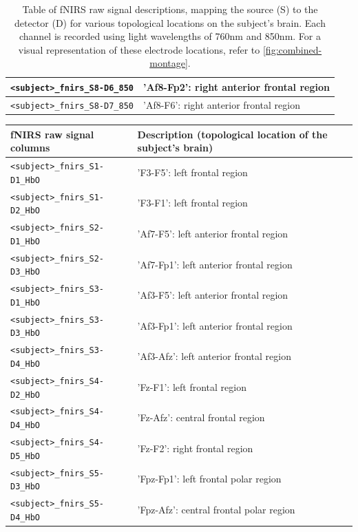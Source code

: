 \begin{table}
\begin{tabularx}{\textwidth}{|l|X|}
  \hline
  \texttt{<subject>\_fnirs\_S8-D6\_850} & 'Af8-Fp2': right anterior frontal region  \\
  \hline
  \texttt{<subject>\_fnirs\_S8-D7\_850} & 'Af8-F6': right anterior frontal region  \\
  \hline
  \end{tabularx}
  \caption{Table of fNIRS raw signal descriptions, mapping the source (S) to the detector (D) for various topological locations on the subject's brain. Each channel is recorded using light wavelengths of 760nm and 850nm. For a visual representation of these electrode locations, refer to \autoref{fig:combined-montage}.}
  \label{tab:fNIRS_raw_signals}
  \end{table}

  \begin{table}
    \centering
    \begin{tabularx}{\textwidth}{|l|X|}
    \hline
    \textbf{fNIRS raw signal columns} & \textbf{Description (topological location of the subject's brain)} \\
    \hline
    \texttt{<subject>\_fnirs\_S1-D1\_HbO} & 'F3-F5': left frontal region \\
    \hline
    \texttt{<subject>\_fnirs\_S1-D2\_HbO} & 'F3-F1': left frontal region  \\
    \hline
    \texttt{<subject>\_fnirs\_S2-D1\_HbO} & 'Af7-F5': left anterior frontal region  \\
    \hline
    \texttt{<subject>\_fnirs\_S2-D3\_HbO} & 'Af7-Fp1': left anterior frontal region  \\
    \hline
    \texttt{<subject>\_fnirs\_S3-D1\_HbO} & 'Af3-F5': left anterior frontal region  \\
    \hline
    \texttt{<subject>\_fnirs\_S3-D3\_HbO} & 'Af3-Fp1': left anterior frontal region  \\
    \hline
    \texttt{<subject>\_fnirs\_S3-D4\_HbO} & 'Af3-Afz': left anterior frontal region  \\
    \hline
    \texttt{<subject>\_fnirs\_S4-D2\_HbO} & 'Fz-F1': left frontal region  \\
    \hline
    \texttt{<subject>\_fnirs\_S4-D4\_HbO} & 'Fz-Afz': central frontal region  \\
    \hline
    \texttt{<subject>\_fnirs\_S4-D5\_HbO} & 'Fz-F2': right frontal region  \\
    \hline
    \texttt{<subject>\_fnirs\_S5-D3\_HbO} & 'Fpz-Fp1': left frontal polar region  \\
    \hline
    \texttt{<subject>\_fnirs\_S5-D4\_HbO} & 'Fpz-Afz': central frontal polar region  \\

\end{tabularx}
\end{table}

